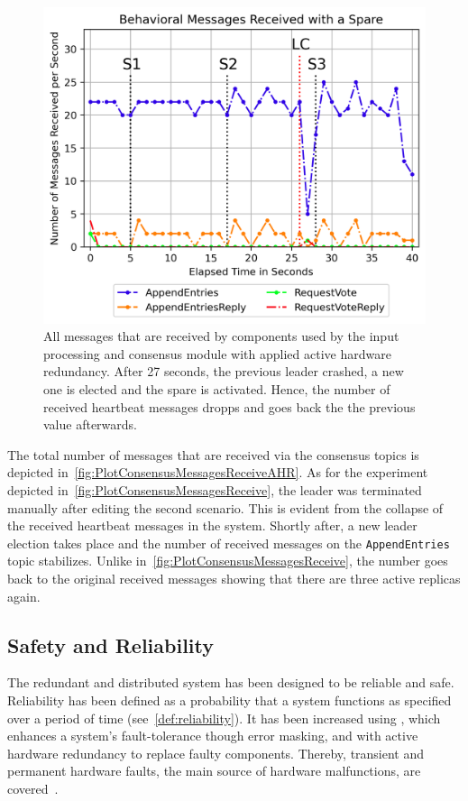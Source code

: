 \begin{figure}[!hb]
	\centering
	\includegraphics[width=0.75\linewidth]{images/plots/ConsensusMessagesReceiveAHR}
	\caption{All messages that are received by components used by the input processing and consensus module with applied active hardware redundancy. After 27 seconds, the previous leader crashed, a new one is elected and the spare is activated. Hence, the number of received heartbeat messages dropps and goes back the the previous value afterwards.}
	\label{fig:PlotConsensusMessagesReceiveAHR}
\end{figure}

The total number of messages that are received via the consensus topics is depicted in~\autoref{fig:PlotConsensusMessagesReceiveAHR}.
As for the experiment depicted in~\autoref{fig:PlotConsensusMessagesReceive}, the leader was terminated manually after editing the second scenario.
This is evident from the collapse of the received heartbeat messages in the system.
Shortly after, a new leader election takes place and the number of received messages on the \texttt{AppendEntries} topic stabilizes.
Unlike in~\autoref{fig:PlotConsensusMessagesReceive}, the number goes back to the original received messages showing that there are three active replicas again.


\subsection{Safety and Reliability}
The redundant and distributed system has been designed to be reliable and safe.
Reliability has been defined as a probability that a system functions as specified over a period of time (see~\autoref{def:reliability}).
It has been increased using , which enhances a system's fault-tolerance though error masking, and with active hardware redundancy to replace faulty components.
Thereby, transient and permanent hardware faults, the main source of hardware malfunctions, are covered~\cite{MULAZZANIReliabilityVsSafety}.

